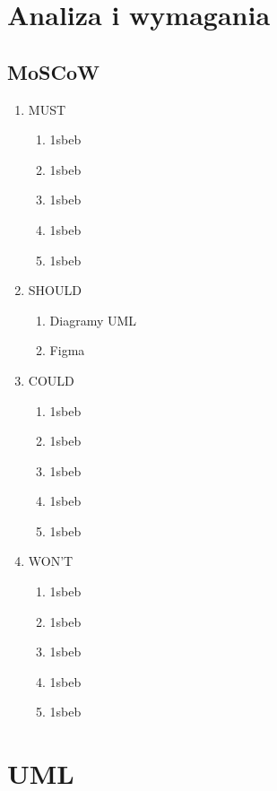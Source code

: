 \documentclass[a4paper,11pt]{article}
\begin{document}
\maketitle

\section{Analiza i wymagania}
\subsection{MoSCoW}


\begin{enumerate}
    \item MUST
    \begin{enumerate}
        \item 1sbeb
        \item 1sbeb
        \item 1sbeb
        \item 1sbeb
        \item 1sbeb
    \end{enumerate}
    \item SHOULD
    \begin{enumerate}
        \item Diagramy UML
        \item Figma
    \end{enumerate}
    \item COULD
    \begin{enumerate}
        \item 1sbeb
        \item 1sbeb
        \item 1sbeb
        \item 1sbeb
        \item 1sbeb
    \end{enumerate}
    \item WON'T
    \begin{enumerate}
        \item 1sbeb
        \item 1sbeb
        \item 1sbeb
        \item 1sbeb
        \item 1sbeb
    \end{enumerate}
\end{enumerate}
\section{UML}
\end{document}
